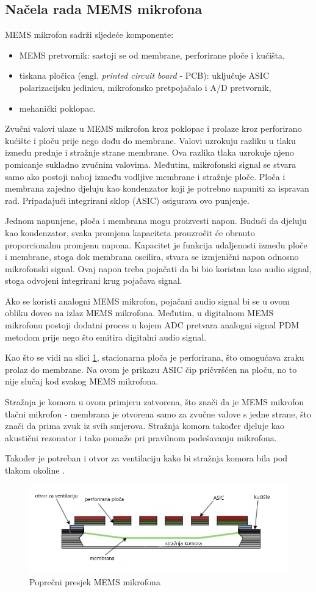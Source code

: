 \subsection{Načela rada MEMS mikrofona}

MEMS mikrofon sadrži sljedeće komponente:
\begin{itemize}
	\item MEMS pretvornik: sastoji se od membrane, perforirane ploče i kućišta,
	\item tiskana pločica (engl. \textit{printed circuit board} - PCB): uključuje ASIC polarizacijsku jedinicu, mikrofonsko pretpojačalo i A/D pretvornik,
	\item mehanički poklopac.
\end{itemize}

Zvučni valovi ulaze u MEMS mikrofon kroz poklopac i prolaze kroz perforirano kućište i ploču prije nego dođu do membrane. Valovi uzrokuju razliku u tlaku između prednje i stražnje strane membrane. Ova razlika tlaka uzrokuje njeno pomicanje sukladno zvučnim valovima. Međutim, mikrofonski signal se stvara samo ako postoji naboj između vodljive membrane i stražnje ploče. 
Ploča i membrana zajedno djeluju kao kondenzator koji je potrebno napuniti za ispravan
rad. Pripadajući integrirani sklop (ASIC) osigurava ovo punjenje.

Jednom napunjene, ploča i membrana mogu proizvesti napon. Budući da djeluju kao kondenzator, svaka promjena kapaciteta prouzročit će obrnuto proporcionalnu promjenu napona. Kapacitet je funkcija udaljenosti između ploče i membrane, stoga dok membrana oscilira, stvara se izmjenični napon odnosno mikrofonski signal. Ovaj napon treba pojačati da bi bio koristan kao audio signal, stoga odvojeni integrirani krug pojačava signal.

Ako se koristi analogni MEMS mikrofon, pojačani audio signal bi se u ovom obliku doveo na izlaz MEMS mikrofona.  Međutim, u digitalnom MEMS mikrofonu postoji dodatni proces u kojem ADC pretvara analogni signal PDM metodom prije nego što emitira digitalni audio signal.

Kao što se vidi na slici \ref{fig:mems-mic}, stacionarna ploča je perforirana, što omogućava zraku prolaz do membrane. Na ovom je prikazu ASIC čip pričvršćen na ploču, no to nije slučaj kod svakog MEMS mikrofona. 

Stražnja je komora u ovom primjeru zatvorena, što znači da je MEMS mikrofon tlačni mikrofon - membrana je otvorena samo za zvučne valove s jedne strane, što znači da prima zvuk iz svih smjerova. Stražnja komora također djeluje kao akustični rezonator i tako pomaže pri pravilnom podešavanju mikrofona.

Također je potreban i otvor za ventilaciju kako bi stražnja komora bila pod tlakom okoline \cite{memsdepth}.

\begin{figure}[ht]
	\includegraphics[width=\linewidth]{imgs/mems_mic}
	\caption{Poprečni presjek MEMS mikrofona \cite{memsdepth}}
	\label{fig:mems-mic}
\end{figure}